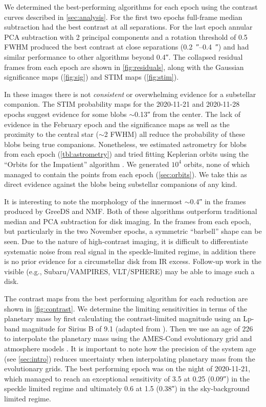 \documentclass[twocolumn]{aastex631}
\begin{document}
We determined the best-performing algorithms for each epoch using the contrast curves described in \autoref{sec:analysis}. For the first two epochs full-frame median subtraction had the best contrast at all separations. For the last epoch annular PCA subtraction with 2 principal components and a rotation threshold of 0.5 FWHM produced the best contrast at close separations (\qtyrange{0.2}{0.4}{\arcsecond}) and had similar performance to other algorithms beyond \ang{;;0.4}. The collapsed residual frames from each epoch are shown in \autoref{fig:residuals}, along with the Gaussian significance maps (\autoref{fig:sig}) and STIM maps (\autoref{fig:stim}).

In these images there is not \textit{consistent} or overwhelming evidence for a substellar companion. The STIM probability maps for the 2020-11-21 and 2020-11-28 epochs suggest evidence for some blobs $\sim$\ang{;;0.13} from the center. The lack of evidence in the February epoch and the significance maps as well as the proximity to the central star ($\sim$2 FWHM) all reduce the probability of these blobs being true companions. Nonetheless, we estimated astrometry for blobs from each epoch (\autoref{tbl:astrometry}) and tried fitting Keplerian orbits using the ``Orbits for the Impatient'' algorithm \citep[OFTI;][]{blunt_orbits_2017}. We generated $10^4$ orbits, none of which managed to contain the points from each epoch (\autoref{sec:orbits}). We take this as direct evidence against the blobs being substellar companions of any kind.

It is interesting to note the morphology of the innermost $\sim$\ang{;;0.4} in the frames produced by GreeDS and NMF. Both of these algorithms outperform traditional median and PCA subtraction for disk imaging. In the frames from each epoch, but particularly in the two November epochs, a symmetric ``barbell'' shape can be seen. Due to the nature of high-contrast imaging, it is difficult to differentiate systematic noise from real signal in the speckle-limited regime, in addition there is no prior evidence for a circumstellar disk from IR excess. Follow-up work in the visible (e.g., Subaru/VAMPIRES, VLT/SPHERE) may be able to image such a disk.

The contrast maps from the best performing algorithm for each reduction are shown in \autoref{fig:contrast}. We determine the limiting sensitivities in terms of the planetary mass by first calculating the contrast-limited magnitude using an Lp-band magnitude for Sirius B of 9.1 (adapted from \citealp{bonnet-bidaud_adonis_2008}). Then we use an age of \qty{226}{\mega\year} to interpolate the planetary mass using the AMES-Cond evolutionary grid and atmosphere models \citep{allard_models_2012}. It is important to note how the precision of the system age (see \autoref{sec:intro}) reduces uncertainty when interpolating planetary mass from the evolutionary grids. The best performing epoch was on the night of 2020-11-21, which managed to reach an exceptional sensitivity of \qty{3.5}{\jupitermass} at \qty{0.25}{\au} (\ang{;;0.09}) in the speckle limited regime and ultimately \qty{0.6}{\jupitermass} at \qty{1.5}{\au} (\ang{;;0.38}) in the sky-background limited regime.
\end{document}
